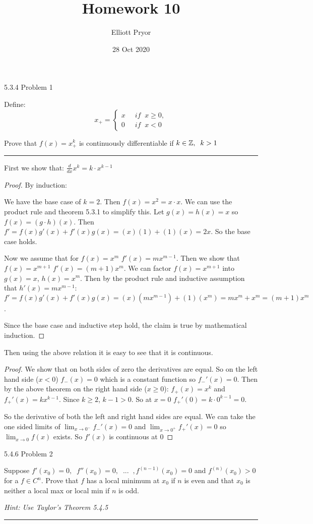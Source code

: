 \documentclass[11pt]{article}
\title{Homework 10}
\author{Elliott Pryor}
\date{28 Oct 2020}
\renewcommand{\sp}{\; \;}
\begin{document}
\maketitle

 5.3.4 Problem 1

Define:
$$x_+ = \begin{cases}
x & \sp if \sp x \geq 0,\\
0 & \sp if \sp x < 0
\end{cases}$$

Prove that $f(x) = x^k_+$ is continuously differentiable if $k \in \integers, \sp k > 1$
\hrule

First we show that: 
$\frac{d}{dx} x^k = k \cdot x^{k-1}$

\begin{proof}
By induction:

We have the base case of $k = 2$. Then $f(x) = x^2 = x \cdot x$. We can use the product rule and theorem 5.3.1 to simplify this.
Let $g(x) = h(x) = x$ so $f(x) = (g \cdot h)(x)$. Then $f' = f(x)g'(x) + f'(x)g(x) = (x)(1) + (1)(x) = 2x$.
So the base case holds. 

Now we assume that for $f(x) = x^m$ $f'(x) = mx^{m-1}$. Then we show that $f(x) = x^{m+1}$ $f'(x) = (m+1)x^m$. 
We can factor $f(x) = x^{m+1}$ into $g(x) = x$, $h(x) = x^m$. 
Then by the product rule and inductive assumption that $h'(x) = mx^{m-1}$: $f' = f(x)g'(x) + f'(x)g(x) = (x)(mx^{m-1}) + (1)(x^m) = mx^m + x^m = (m+1)x^m$.

Since the base case and inductive step hold, the claim is true by mathematical induction.

\end{proof}

Then using the above relation it is easy to see that it is continuous. 

\begin{proof}

We show that on both sides of zero the derivatives are equal. 
So on the left hand side ($x < 0$) $f_-(x) = 0$ which is a constant function so $f_-'(x) = 0$. 
Then by the above theorem on the right hand side ($x \geq 0$): $f_+(x) = x^k$ and $f_+'(x) = k x^{k-1}$. 
Since $k \geq 2$, $k - 1 > 0$. So at $x = 0$ $f_+'(0) = k \cdot 0^{k-1} = 0$. 

So the derivative of both the left and right hand sides are equal.  We can take the one sided limits of $\lim_{x \to 0 ^-} f_-'(x) = 0$ and $\lim_{x \to 0 ^+} f_+'(x) = 0$ so $\lim_{x \to 0} f(x)$ exists. So $f'(x)$ is continuous at 0

\end{proof}


 5.4.6 Problem 2

Suppose $f'(x_0) = 0, \sp f''(x_0) = 0, \sp ... \sp, f^{(n-1)}(x_0) = 0$ and $f^{(n)} (x_0) > 0$ for a $f \in C^n$. Prove that $f$ has a local minimum at $x_0$ if $n$ is even and that $x_0$ is neither a local max or local min if $n$ is odd. 

\textit{Hint: Use Taylor's Theorem 5.4.5}
\hrule 
\end{document}
